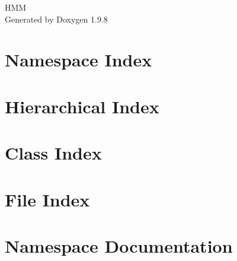 \documentclass[twoside]{book}
\newcommand{\+}{\discretionary{\mbox{\scriptsize$\hookleftarrow$}}{}{}}
\newcommand{\clearemptydoublepage}{%
    \newpage{\pagestyle{empty}\cleardoublepage}%
  }
\begin{document}
  \raggedbottom
    \hypersetup{pageanchor=false,
                bookmarksnumbered=true,
                pdfencoding=unicode
               }
  \begin{titlepage}
  \vspace*{7cm}
  \begin{center}%
  {\Large HMM}\\
  \vspace*{1cm}
  {\large Generated by Doxygen 1.9.8}\\
  \end{center}
  \end{titlepage}
  \clearemptydoublepage
  \tableofcontents
  \clearemptydoublepage
  \hypersetup{pageanchor=true}
\chapter{Namespace Index}

\chapter{Hierarchical Index}

\chapter{Class Index}

\chapter{File Index}

\chapter{Namespace Documentation}


\end{document}
